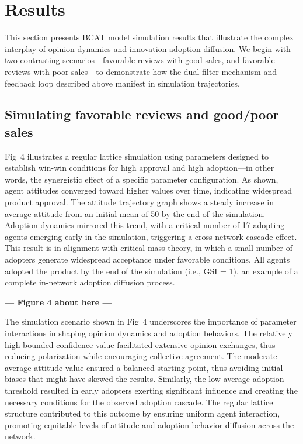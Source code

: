 \documentclass[10pt,letterpaper]{article}
\begin{document}
\section*{Results}

This section presents BCAT model simulation results that illustrate the complex interplay of opinion dynamics and innovation adoption diffusion. We begin with two contrasting scenarios---favorable reviews with good sales, and favorable reviews with poor sales---to demonstrate how the dual-filter mechanism and feedback loop described above manifest in simulation trajectories.

\subsection*{Simulating favorable reviews and good/poor sales}

Fig~4 illustrates a regular lattice simulation using parameters designed to establish win-win conditions for high approval and high adoption---in other words, the synergistic effect of a specific parameter configuration. As shown, agent attitudes converged toward higher values over time, indicating widespread product approval. The attitude trajectory graph shows a steady increase in average attitude from an initial mean of 50 by the end of the simulation. Adoption dynamics mirrored this trend, with a critical number of 17 adopting agents emerging early in the simulation, triggering a cross-network cascade effect. This result is in alignment with critical mass theory, in which a small number of adopters generate widespread acceptance under favorable conditions. All agents adopted the product by the end of the simulation (i.e., GSI = 1), an example of a complete in-network adoption diffusion process.



\begin{center}\textbf{--- Figure 4 about here ---}\end{center}


The simulation scenario shown in Fig~4 underscores the importance of parameter interactions in shaping opinion dynamics and adoption behaviors. The relatively high bounded confidence value facilitated extensive opinion exchanges, thus reducing polarization while encouraging collective agreement. The moderate average attitude value ensured a balanced starting point, thus avoiding initial biases that might have skewed the results. Similarly, the low average adoption threshold resulted in early adopters exerting significant influence and creating the necessary conditions for the observed adoption cascade. The regular lattice structure contributed to this outcome by ensuring uniform agent interaction, promoting equitable levels of attitude and adoption behavior diffusion across the network.
\end{document}
